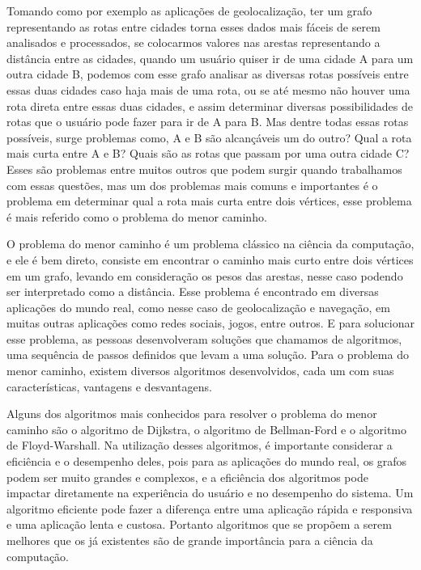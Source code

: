 \documentclass[bacharelado]{pre-projeto-computacao}
\begin{document}
  Tomando como por exemplo as aplicações de geolocalização, ter um grafo representando as rotas entre cidades torna esses dados mais fáceis de serem analisados e processados, se colocarmos valores nas arestas representando a distância entre as cidades, quando um usuário quiser ir de uma cidade A para um outra cidade B, podemos com esse grafo analisar as diversas rotas possíveis entre essas duas cidades caso haja mais de uma rota, ou se até mesmo não houver uma rota direta entre essas duas cidades, e assim determinar diversas possibilidades de rotas que o usuário pode fazer para ir de A para B. Mas dentre todas essas rotas possíveis, surge problemas como, A e B são alcançáveis um do outro? Qual a rota mais curta entre A e B? Quais são as rotas que passam por uma outra cidade C? Esses são problemas entre muitos outros que podem surgir quando trabalhamos com essas questões, mas um dos problemas mais comuns e importantes é o problema em determinar qual a rota mais curta entre dois vértices, esse problema é mais referido como o problema do menor caminho.

  O problema do menor caminho é um problema clássico na ciência da computação, e ele é bem direto, consiste em encontrar o caminho mais curto entre dois vértices em um grafo, levando em consideração os pesos das arestas, nesse caso podendo ser interpretado como a distância. Esse problema é encontrado em diversas aplicações do mundo real, como nesse caso de geolocalização e navegação, em muitas outras aplicações como redes sociais, jogos, entre outros. E para solucionar esse problema, as pessoas desenvolveram soluções que chamamos de algoritmos, uma sequência de passos definidos que levam a uma solução. Para o problema do menor caminho, existem diversos algoritmos desenvolvidos, cada um com suas características, vantagens e desvantagens.

  Alguns dos algoritmos mais conhecidos para resolver o problema do menor caminho são o algoritmo de Dijkstra, o algoritmo de Bellman-Ford e o algoritmo de Floyd-Warshall. Na utilização desses algoritmos, é importante considerar a eficiência e o desempenho deles, pois para as aplicações do mundo real, os grafos podem ser muito grandes e complexos, e a eficiência dos algoritmos pode impactar diretamente na experiência do usuário e no desempenho do sistema. Um algoritmo eficiente pode fazer a diferença entre uma aplicação rápida e responsiva e uma aplicação lenta e custosa. Portanto algoritmos que se propõem a serem melhores que os já existentes são de grande importância para a ciência da computação.
\end{document}
